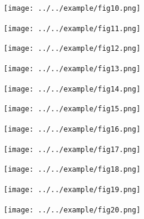 \documentclass[a4paper,12pt]{article}
\begin{document}
\begin{figure}[p]
\begin{center}
\texttt{[image: ../../example/fig10.png]}
\end{center}
\end{figure}

\begin{figure}[p]
\begin{center}
\texttt{[image: ../../example/fig11.png]}
\end{center}
\end{figure}

\begin{figure}[p]
\begin{center}
\texttt{[image: ../../example/fig12.png]}
\end{center}
\end{figure}

\begin{figure}[p]
\begin{center}
\texttt{[image: ../../example/fig13.png]}
\end{center}
\end{figure}

\begin{figure}[p]
\begin{center}
\texttt{[image: ../../example/fig14.png]}
\end{center}
\end{figure}

\begin{figure}[p]
\begin{center}
\texttt{[image: ../../example/fig15.png]}
\end{center}
\end{figure}

\begin{figure}[p]
\begin{center}
\texttt{[image: ../../example/fig16.png]}
\end{center}
\end{figure}

\FloatBarrier

\begin{figure}[p]
\begin{center}
\texttt{[image: ../../example/fig17.png]}
\end{center}
\end{figure}

\begin{figure}[p]
\begin{center}
\texttt{[image: ../../example/fig18.png]}
\end{center}
\end{figure}

\FloatBarrier

\begin{figure}[p]
\begin{center}
\texttt{[image: ../../example/fig19.png]}
\end{center}
\end{figure}

\begin{figure}[p]
\begin{center}
\texttt{[image: ../../example/fig20.png]}
\end{center}
\end{figure}
\end{document}
